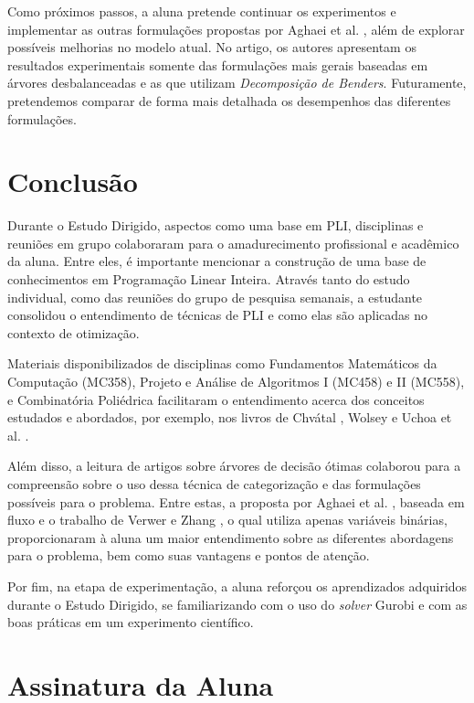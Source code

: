 \documentclass[12pt,a4paper]{article}
\begin{document}
Como próximos passos, a aluna pretende continuar os experimentos e implementar as outras formulações propostas
por Aghaei et al. \cite{Aghaei24}, além de explorar possíveis melhorias no modelo atual. No artigo, os autores
apresentam os resultados experimentais somente das formulações mais gerais baseadas em árvores desbalanceadas 
e as que utilizam \emph{Decomposição de Benders}. Futuramente, pretendemos comparar de forma mais detalhada
os desempenhos das diferentes formulações.

\section{Conclusão}

Durante o Estudo Dirigido, aspectos como uma base em PLI, disciplinas e reuniões
em grupo colaboraram para o amadurecimento profissional e acadêmico da aluna. 
Entre eles, é importante mencionar a construção de uma base de conhecimentos em Programação Linear Inteira.
Através tanto do estudo individual, como das reuniões do grupo de pesquisa semanais, a estudante consolidou 
o entendimento de técnicas de PLI e como elas são aplicadas no contexto de otimização. 

Materiais disponibilizados de disciplinas como Fundamentos Matemáticos da Computação (MC358),
Projeto e Análise de Algoritmos I (MC458) e II (MC558), e Combinatória Poliédrica facilitaram o entendimento acerca dos conceitos estudados e abordados, por exemplo, nos livros de Chvátal \cite{Chvatal1983}, Wolsey \cite{Wolsey2021} 
e Uchoa et al. \cite{Uchoa2024}.

Além disso, a leitura de artigos sobre árvores de decisão ótimas colaborou para a compreensão sobre o uso dessa técnica de categorização
e das formulações possíveis para o problema. Entre estas, a proposta por Aghaei et al. \cite{Aghaei24}, baseada em
fluxo e o trabalho de Verwer e Zhang \cite{Verwer2019}, o qual utiliza apenas variáveis binárias, proporcionaram à aluna um maior entendimento 
sobre as diferentes abordagens para o problema, bem como suas vantagens e pontos de atenção.

Por fim, na etapa de experimentação, a aluna reforçou os aprendizados adquiridos durante o Estudo Dirigido, 
se familiarizando com o uso do \emph{solver} Gurobi \cite{Gurobi} e com as boas práticas em um experimento científico.

\section*{Assinatura da Aluna}

\begingroup
\onehalfspacing
\printbibliography
\endgroup
\end{document}

